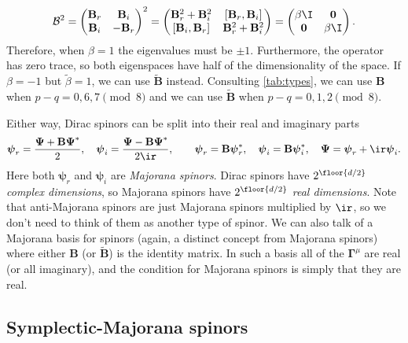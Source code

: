 \documentclass[11pt]{article}
\newcommand{\Gammab}{\boldsymbol{\Gamma}}
\newcommand{\B}{\mathbf{B}}
\newcommand{\Bt}{\widetilde{\B}}
\newcommand{\psib}{\boldsymbol{\psi}}
\newcommand{\Psib}{\boldsymbol{\Psi}}
\newcommand{\betat}{\tilde{\beta}}
\begin{document}
\begin{equation*}
  \mathcal{B}^2 =
    \begin{pmatrix}
      \B_r &  \B_i \\
      \B_i & -\B_r \\
    \end{pmatrix}^2
  =
    \begin{pmatrix}
      \B_r^2 + \B_i^2 & [\B_r, \B_i]    \\
      [\B_i, \B_r]    & \B_r^2 + \B_i^2 \\
    \end{pmatrix}
  =
    \begin{pmatrix}
      \beta \I   & \mathbf{0} \\
      \mathbf{0} & \beta \I   \\
    \end{pmatrix}.
\end{equation*}
%
Therefore, when $\beta=1$ the eigenvalues must be $\pm 1$.
Furthermore, the operator has zero trace, so both eigenspaces have half of the dimensionality of the space.
If $\beta=-1$ but $\betat=1$, we can use $\Bt$ instead.
Consulting \cref{tab:types}, we can use $\B$ when $p-q = 0,6,7 \pmod 8$ and we can use $\Bt$ when $p-q = 0,1,2 \pmod 8$.

Either way, Dirac spinors can be split into their real and imaginary parts
%
\begin{equation}\label{eq:majorana}
  \psib_r = \frac{\Psib + \B \Psib^\ast}{2},
  \quad
  \psib_i = \frac{\Psib - \B \Psib^\ast}{2\ir},
  \qquad
  \psib_r = \B \psib^\ast_r,
  \quad
  \psib_i = \B \psib^\ast_i,
  \quad
  \Psib = \psib_r + \ir \psib_i.
\end{equation}
%
Here both $\psib_r$ and $\psib_i$ are \emph{Majorana spinors}.
Dirac spinors have $2^{\floor{d/2}}$ \emph{complex dimensions}, so Majorana spinors have $2^{\floor{d/2}}$ \emph{real dimensions}.
Note that anti-Majorana spinors are just Majorana spinors multiplied by $\ir$, so we don't need to think of them as another type of spinor.
We can also talk of a Majorana basis for spinors (again, a distinct concept from Majorana spinors) where either $\B$ (or $\Bt$) is the identity matrix.
In such a basis all of the $\Gammab^\mu$ are real (or all imaginary), and the condition for Majorana spinors is simply that they are real.


\subsection{Symplectic-Majorana spinors}\label{sec:symplecticmajorana}
\end{document}
